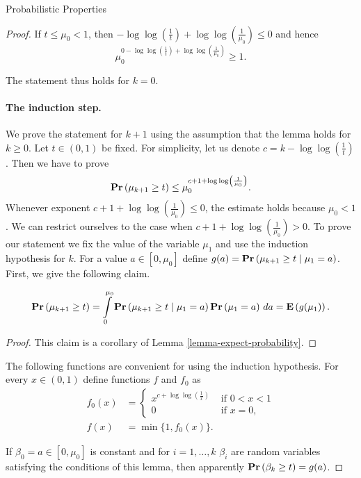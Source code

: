 \begin{section}{Probabilistic Properties}
\begin{proof}
If $t \leq \mu_0 < 1$, then $-\log \log \left(\frac{1}{t}\right) + \log \log \left(\frac{1}{\mu_0}\right) \leq 0$ and hence
\[
	\mu_0^{0 - \log \log \left(\frac{1}{t}\right) + \log \log \left(\frac{1}{\mu_0}\right)} \geq 1 \text{.}
\]

The statement thus holds for $k = 0$.

\paragraph*{The induction step.} We prove the statement for $k + 1$ using the assumption that the lemma holds for $k \geq 0$. Let $t \in (0, 1)$ be fixed. For simplicity, let us denote $c = k - \log \log \left(\frac{1}{t}\right)$. Then we have to prove
\[
	\mathbf{Pr}\left(\mu_{k + 1} \geq t\right) \leq \mu_0 ^ {c + 1 + \log \log \left(\frac{1}{\mu_0}\right)} \text{.}
\]
Whenever exponent $c + 1 + \log \log \left(\frac{1}{\mu_0}\right) \leq 0$, the estimate holds because $\mu_0 < 1$. We can restrict ourselves to the case when $c + 1 + \log \log \left(\frac{1}{\mu_0}\right) > 0$. To prove our statement we fix the value of the variable $\mu_1$ and use the induction hypothesis for $k$. For a value $a \in \left[0, \mu_0\right]$ define $g(a) = \mathbf{Pr}\left(\mu_{k + 1} \geq t \mid \mu_1 = a\right)$. First, we give the following claim.
\begin{claim}
\label{claim-expected-value}
\[
	\mathbf{Pr}\left(\mu_{k + 1} \geq t\right) = \int\limits_{0}^{\mu_0}\mathbf{Pr}\left(\mu_{k + 1} \geq t \mid \mu_1 = a\right)\mathbf{Pr}\left(\mu_1 = a\right) \, da = \mathbf{E}\left(g(\mu_1)\right) \text{.}
\]
\end{claim}
\begin{proof}
This claim is a corollary of Lemma \ref{lemma-expect-probability}.
\end{proof}

The following functions are convenient for using the induction hypothesis. For every $x \in (0, 1)$ define functions $f$ and $f_0$ as
\[ 
\begin{split}
f_0(x) &= \begin{cases}
	x ^ {c + \log \log \left(\frac{1}{x}\right)} & \text{ if } 0 < x < 1 \\ 
	0 & \text{ if } x = 0 \text{,}
\end{cases} \\
f(x) & = \min \{1, f_0(x) \} \text{.} 
\end{split}
\]

If $\beta_0 = a \in \left[0, \mu_0 \right]$ is constant and for $i = 1, \dots, k$ $\beta_i$ are random variables satisfying the conditions of this lemma, then apparently $\mathbf{Pr}\left(\beta_k \geq t\right) = g(a)$. 


\end{proof}
\end{section}
